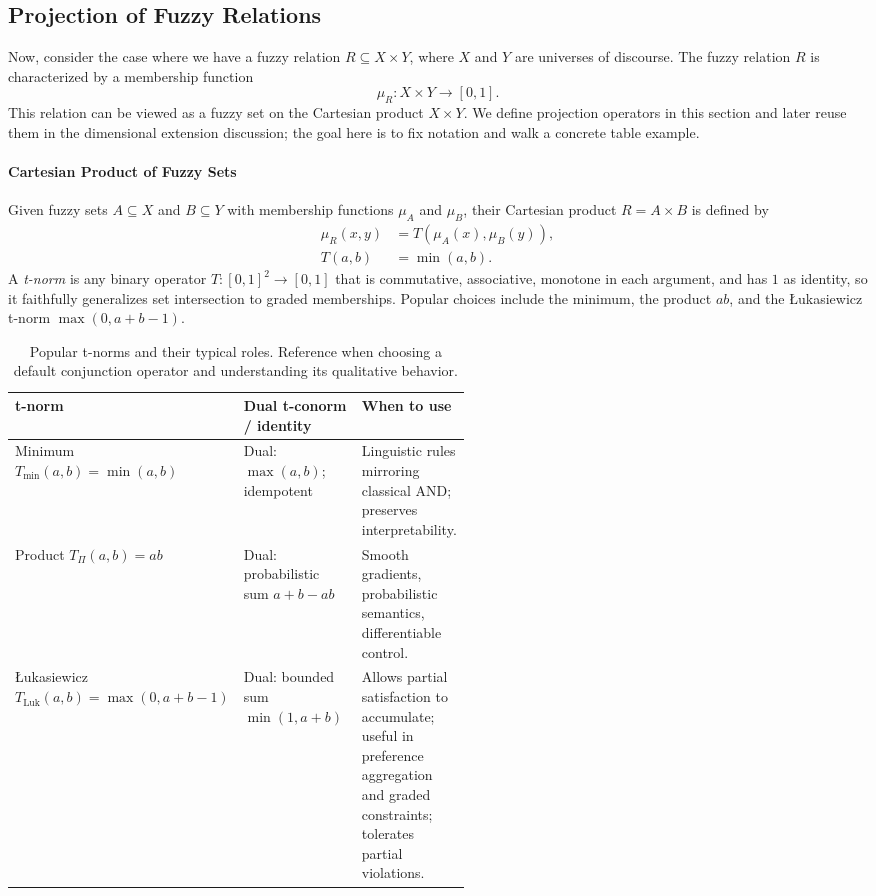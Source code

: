 \subsection{Projection of Fuzzy Relations}
\label{sec:fuzzyrelations_projection_of_fuzzy_relations}

Now, consider the case where we have a fuzzy relation \( R \subseteq X \times Y \), where \( X \) and \( Y \) are universes of discourse. The fuzzy relation \( R \) is characterized by a membership function
\[
    \mu_R: X \times Y \to [0,1].
\]
This relation can be viewed as a fuzzy set on the Cartesian product \( X \times Y \).
We define projection operators in this section and later reuse them in the dimensional extension discussion; the goal here is to fix notation and walk a concrete table example.

\paragraph{Cartesian Product of Fuzzy Sets}

Given fuzzy sets \( A \subseteq X \) and \( B \subseteq Y \) with membership functions \( \mu_A \) and \( \mu_B \), their Cartesian product \( R = A \times B \) is defined by
\begin{equation}
\begin{aligned}
\mu_R(x, y) &= T(\mu_A(x), \mu_B(y)),\\
T(a, b) &= \min(a, b).
\end{aligned}
\label{eq:relation_cartesian_product}
\end{equation}
A \emph{t\hyp{}norm} is any binary operator \(T: [0,1]^2 \to [0,1]\) that is commutative, associative, monotone in each argument, and has \(1\) as identity, so it faithfully generalizes set intersection to graded memberships. Popular choices include the minimum, the product \(ab\), and the \L{}ukasiewicz t\hyp{}norm \(\max(0, a+b-1)\).


\begin{table}[h]
\centering
\caption{Popular t\hyp{}norms and their typical roles. Reference when choosing a default conjunction operator and understanding its qualitative behavior.}
\label{tab:tnorms}
\begin{tabularx}{0.94\linewidth}{@{}>{\raggedright\arraybackslash}p{0.23\linewidth} >{\raggedright\arraybackslash}p{0.3\linewidth} >{\raggedright\arraybackslash}X@{}}
\toprule
\textbf{t\hyp{}norm} & \textbf{Dual t\hyp{}conorm / identity} & \textbf{When to use} \\
\midrule
Minimum \(T_{\min}(a, b)=\min(a, b)\) & Dual: $\max(a, b)$; idempotent & Linguistic rules mirroring classical AND; preserves interpretability. \\
Product \(T_{\Pi}(a, b)=ab\) & Dual: probabilistic sum \(a+b-ab\) & Smooth gradients, probabilistic semantics, differentiable control. \\
\L{}ukasiewicz \(T_{\text{Luk}}(a, b)=\max(0, a+b-1)\) & Dual: bounded sum $\min(1, a+b)$ & Allows partial satisfaction to accumulate; useful in preference aggregation and graded constraints; tolerates partial violations. \\
\bottomrule
\end{tabularx}
\end{table}

